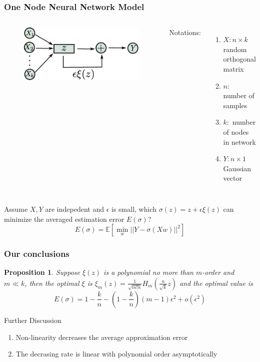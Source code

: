 \documentclass{beamer}
\newtheorem{proposition}{Proposition}
\begin{document}
\begin{frame}
\frametitle{One Node Neural Network Model}
\begin{columns}
\column{5cm}
\begin{figure}
\includegraphics[width=\textwidth]{../network_structure.eps}
\end{figure}
\column{5cm}
Notations:
\begin{enumerate}
\item $X: n \times k$ random orthogonal matrix
\item $n :$ number of samples
\item $k: $ number of nodes in network 
\item $Y: n \times 1$ Gaussian vector
\end{enumerate}
\end{columns}
\vskip 0.5cm
Assume $X,Y$ are indepedent and $\epsilon$ is small, which $\sigma(z) = z + \epsilon \xi(z)$ can minimize the averaged estimation error $E(\sigma)$?
$$
E(\sigma)= \mathbb{E}[\min_{w} || Y - \sigma(X w) ||^2]
$$
\end{frame}
\begin{frame}
\frametitle{Our conclusions}
\begin{proposition}
Suppose $\xi(z)$ is a polynomial no more than $m$-order and $m\ll k$, then the optimal $\xi$ is $\xi_m(z) = \frac{1}{\sqrt{m! n}}H_m(\frac{n}{\sqrt{k}} z)$ and the optimal value is
$$
E(\sigma) = 1-\frac{k}{n}  - (1-\frac{k}{n})(m-1)  \epsilon^2 + o(\epsilon^2)
$$
\end{proposition}
\begin{block}{Further Discussion}
\begin{enumerate}
\item Non-linearity decreases the average approximation error
\item The decrasing rate is linear with polynomial order asymptotically
\end{enumerate}
\end{block}
\end{frame}
\end{document}
